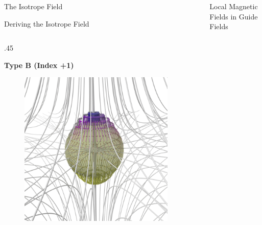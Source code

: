 \documentclass[final]{beamer}
\newlength{\sepwid}
\newlength{\onecolwid}
\newlength{\twocolwid}
\begin{document}
\begin{frame}[t]
\begin{columns}[t]
\begin{column}{\onecolwid}
\begin{block}{\huge{The Isotrope Field}}
\begin{block}{Deriving the Isotrope Field}
\begin{columns}[t,totalwidth=\onecolwid]
    \begin{column}{.45\onecolwid}
        \begin{centering}
        \textbf{Type B (Index +1)}
        \begin{figure}
        \includegraphics[width=.45\onecolwid]{fig/posindex_start.png}
        \end{figure}
    \end{centering}
    \end{column}
  \end{columns}
\end{block}

\end{block}
\end{column}


\begin{column}{\sepwid}\end{column} %
\begin{column}{\twocolwid} %

\begin{block}{\huge{Local Magnetic Fields in Guide Fields}}

\begin{columns}[t,totalwidth=\twocolwid]


\end{columns}
\end{block}
\end{column}
\end{columns}
\end{frame}
\end{document}
